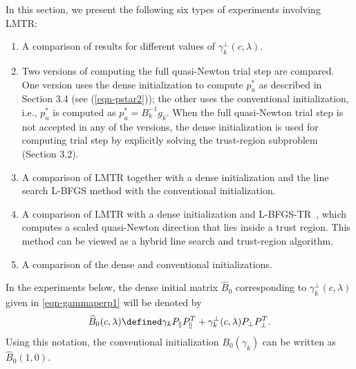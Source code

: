 \bigskip

In this section, we present the following six types of experiments involving {\small LMTR}:
\newline


\begin{enumerate}
\item A comparison of results for different values of $\gamma_k^{\perp}(c,\lambda)$. 
\item Two versions of computing the full quasi-Newton trial step %
 are compared. One version uses the dense initialization to
    compute $p_u^*$ as described in Section 3.4 (see (\ref{eqn-pstar2})); the other uses the conventional
    initialization, i.e., $p_u^*$ is computed as
    $p_u^*=B_k^{-1}g_k$. 
    When the full quasi-Newton trial step is not accepted in any of the versions, the dense initialization is used for computing trial step by explicitly solving the trust-region subproblem (Section 3.2).
\item A comparison of {\small LMTR} together with a
dense initialization and the line search {\small L-BFGS} method
with the conventional initialization.
\item A comparison of {\small LMTR} 
with a
dense initialization and 
{\small L-BFGS-TR}~\cite{BurdakovLMTR16},
which computes a scaled quasi-Newton direction that lies inside a trust
region.  This method can be viewed as a hybrid line search and trust-region
algorithm.
\item A comparison of the dense and conventional initializations.
\end{enumerate}

\medskip 

In the experiments below, the dense initial matrix $\widehat{B}_0$
corresponding to $\gamma_k^{\perp}(c,\lambda)$ given in \eqref{eqn-gammaperp1}
will be denoted by
$$
	\widehat{B}_0(c,\lambda) 
	\defined
	\gamma_k P_{\parallel}P_{\parallel}^T + 
	\gamma_k^{\perp}(c,\lambda) P_{\perp}P_{\perp}^T.
$$
Using this notation, the conventional initialization $B_0(\gamma_k)$
can be written as $\widehat{B}_0(1,0)$.

